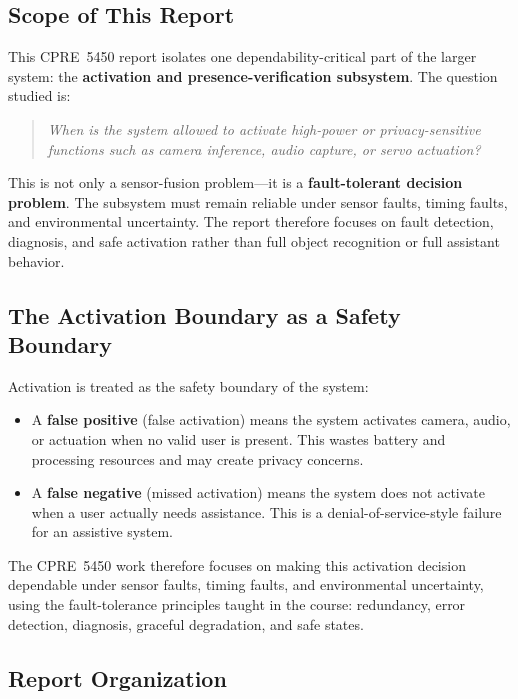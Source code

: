 \documentclass[12pt]{extarticle}
\begin{document}
\subsection{Scope of This Report}

This CPRE~5450 report isolates one dependability-critical part of the larger system:
the \textbf{activation and presence-verification subsystem}.
The question studied is:
\begin{quote}
\emph{When is the system allowed to activate high-power or privacy-sensitive functions
such as camera inference, audio capture, or servo actuation?}
\end{quote}

This is not only a sensor-fusion problem---it is a \textbf{fault-tolerant decision
problem}.
The subsystem must remain reliable under sensor faults, timing faults, and environmental
uncertainty.
The report therefore focuses on fault detection, diagnosis, and safe activation rather
than full object recognition or full assistant behavior.

\subsection{The Activation Boundary as a Safety Boundary}

Activation is treated as the safety boundary of the system:
\begin{itemize}
  \item A \textbf{false positive} (false activation) means the system activates
        camera, audio, or actuation when no valid user is present.
        This wastes battery and processing resources and may create privacy concerns.
  \item A \textbf{false negative} (missed activation) means the system does not
        activate when a user actually needs assistance.
        This is a denial-of-service-style failure for an assistive system.
\end{itemize}

The CPRE~5450 work therefore focuses on making this activation decision dependable under
sensor faults, timing faults, and environmental uncertainty, using the fault-tolerance
principles taught in the course: redundancy, error detection, diagnosis, graceful
degradation, and safe states.

\subsection{Report Organization}
\end{document}

